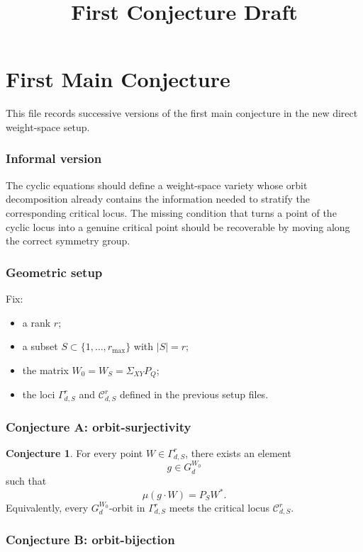 \documentclass{article}
\title{First Conjecture Draft}
\date{}
\theoremstyle{definition}
\newtheorem{conjecture}[theorem]{Conjecture}
\begin{document}
\maketitle

\section{First Main Conjecture}

This file records successive versions of the first main conjecture in the new direct weight-space setup.

\subsubsection*{Informal version}

The cyclic equations should define a weight-space variety whose orbit decomposition already contains the information needed to stratify the corresponding critical locus. The missing condition that turns a point of the cyclic locus into a genuine critical point should be recoverable by moving along the correct symmetry group.

\subsubsection*{Geometric setup}

Fix:
\begin{itemize}
\item a rank $r$;
\item a subset $S\subset \{1,\dots,r_{\max}\}$ with $|S|=r$;
\item the matrix $W_0=W_S=\Sigma_{XY}P_Q$;
\item the loci $\Gamma_{d,S}^r$ and $\mathcal C_{d,S}^r$ defined in the previous setup files.
\end{itemize}

\subsubsection*{Conjecture A: orbit-surjectivity}

\begin{conjecture}
For every point $W\in \Gamma_{d,S}^r$, there exists an element
\[
g\in G_d^{W_0}
\]
such that
\[
\mu(g\cdot W)=P_SW^\ast.
\]
Equivalently, every $G_d^{W_0}$-orbit in $\Gamma_{d,S}^r$ meets the critical locus $\mathcal C_{d,S}^r$.
\end{conjecture}

\subsubsection*{Conjecture B: orbit-bijection}
\end{document}

